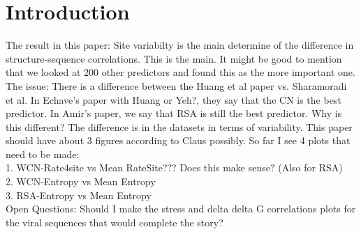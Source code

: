\documentclass[12pt]{article}
\begin{document}
\section{Introduction}
\label{sec:intro}

{\color{blue}
The result in this paper: Site variabilty is the main determine of the difference in structure-sequence correlations. This is the main. It might be good to mention that we looked at 200 other predictors and found this as the more important one. The issue: There is a difference between the Huang et al paper vs. Sharamoradi et al. In Echave's paper with Huang or Yeh?, they say that the CN is the best predictor. In Amir's paper, we say that RSA is still the best predictor. Why is this different? The difference is in the datasets in terms of variability. This paper should have about 3 figures according to Claus possibly. So far I see 4 plots that need to be made: \\
1. WCN-Rate4site vs Mean RateSite??? Does this make sense? (Also for RSA) \\
2. WCN-Entropy vs Mean Entropy \\
3. RSA-Entropy vs Mean Entropy \\
Open Questions: Should I make the stress  and delta delta G correlations plots for the viral sequences that would complete the story?}
\end{document}
